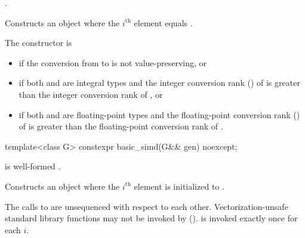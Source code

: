 \begin{itemdescr}
  \pnum\constraints
  .

  \pnum\effects
  Constructs an object where the $i^\text{th}$ element equals  \foralli.

  \pnum\remarks
  The constructor is 
  \begin{itemize}
    \item if the conversion from  to  is not
      value-preserving, or

    \item if both  and  are integral types and the
      integer conversion rank () of  is greater than
      the integer conversion rank of , or

    \item if both  and  are floating-point types and
      the floating-point conversion rank () of  is
      greater than the floating-point conversion rank of .
  \end{itemize}
\end{itemdescr}

\begin{itemdecl}
template<class G> constexpr basic_simd(G&& gen) noexcept;
\end{itemdecl}

\begin{itemdescr}
  \pnum\constraints
   is well-formed \foralli.

  \pnum\effects
  Constructs an object where the $i^\text{th}$ element is initialized to .

  \pnum
    The calls to  are unsequenced with respect to each other. Vectorization-unsafe standard library functions may not be invoked by  ().  is invoked exactly once for each $i$.
\end{itemdescr}

\newcommand\SimdLoadDescr[2]{
  \pnum\constraints
  \begin{itemize}
    \item \tcode{iter_value_t<It>} is a vectorizable type, and
    \item \tcode{It} satisfies \tcode{contiguous_iterator}.
  \end{itemize}

  \pnum\mandates
  \conversionFlagsMandate{iter_value_t<It>}{value_type}

  \pnum\expects
  \begin{itemize}
    \item #1
    \item \tcode{It} models \tcode{contiguous_iterator}.
    \flagsRequires{basic_simd, iter_value_t<It>}{iter_value_t<It>}
  \end{itemize}

  \pnum\effects #2

  \pnum\throws Nothing.
}

